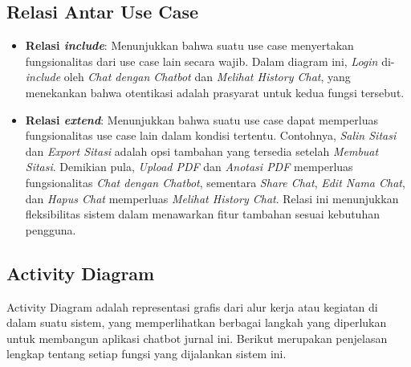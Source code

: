 \subsection{Relasi Antar Use Case}
\begin{itemize}
    \item \textbf{Relasi \textit{include}}: Menunjukkan bahwa suatu use case menyertakan fungsionalitas dari use case lain secara wajib. Dalam diagram ini, \textit{Login} di-\textit{include} oleh \textit{Chat dengan Chatbot} dan \textit{Melihat History Chat}, yang menekankan bahwa otentikasi adalah prasyarat untuk kedua fungsi tersebut.
    
    \item \textbf{Relasi \textit{extend}}: Menunjukkan bahwa suatu use case dapat memperluas fungsionalitas use case lain dalam kondisi tertentu. Contohnya, \textit{Salin Sitasi} dan \textit{Export Sitasi} adalah opsi tambahan yang tersedia setelah \textit{Membuat Sitasi}. Demikian pula, \textit{Upload PDF} dan \textit{Anotasi PDF} memperluas fungsionalitas \textit{Chat dengan Chatbot}, sementara \textit{Share Chat}, \textit{Edit Nama Chat}, dan \textit{Hapus Chat} memperluas \textit{Melihat History Chat}. Relasi ini menunjukkan fleksibilitas sistem dalam menawarkan fitur tambahan sesuai kebutuhan pengguna.
\end{itemize}

\subsection{Activity Diagram}

Activity Diagram adalah representasi grafis dari alur kerja atau kegiatan di dalam suatu sistem, yang memperlihatkan berbagai langkah yang diperlukan untuk membangun aplikasi chatbot jurnal ini. Berikut merupakan penjelasan lengkap tentang setiap fungsi yang dijalankan sistem ini.

